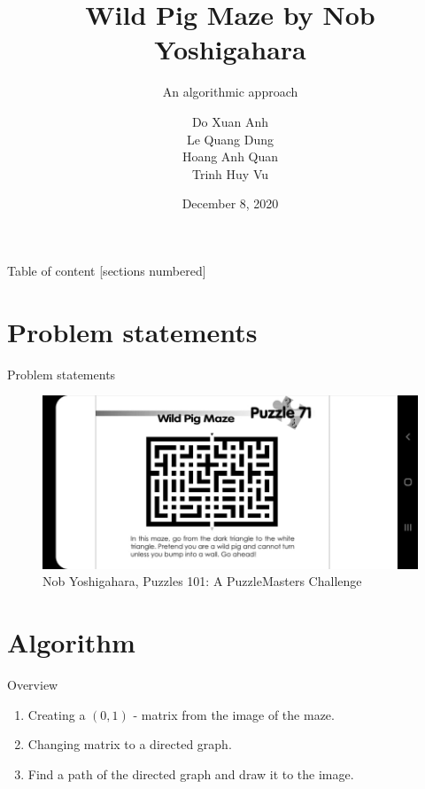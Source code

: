\documentclass[10pt]{beamer}
\title[Wild Pig Maze title]{Wild Pig Maze by Nob Yoshigahara}
\subtitle{An algorithmic approach}
\date{December 8, 2020}
\author[shortname]{
  Do Xuan Anh \\ %
  Le Quang Dung \\ %
  Hoang Anh Quan \\ %
  Trinh Huy Vu \\ %
  }
\begin{document}
\begin{frame}
	\maketitle
\end{frame}

\begin{frame}{Table of content}
	[sections numbered]
	\tableofcontents[hideallsubsections]
\end{frame}

\section{Problem statements}

\begin{frame}{Problem statements}
  \begin{figure}[htb!] %
    \centering
    \includegraphics[trim={3cm 0cm 3cm 0cm},clip,scale=0.4]{../images/input_image.jpg}
    \caption{Nob Yoshigahara, Puzzles 101: A PuzzleMasters Challenge}
    \label{fig:} %
  \end{figure}
\end{frame}

\section{Algorithm}

\begin{frame}{Overview}
  \begin{enumerate}
    \item Creating a $(0, 1)$ - matrix from the image of the maze.
    \item Changing matrix to a directed graph.
    \item Find a path of the directed graph and draw it to the image.
  \end{enumerate}
\end{frame}
\end{document}
